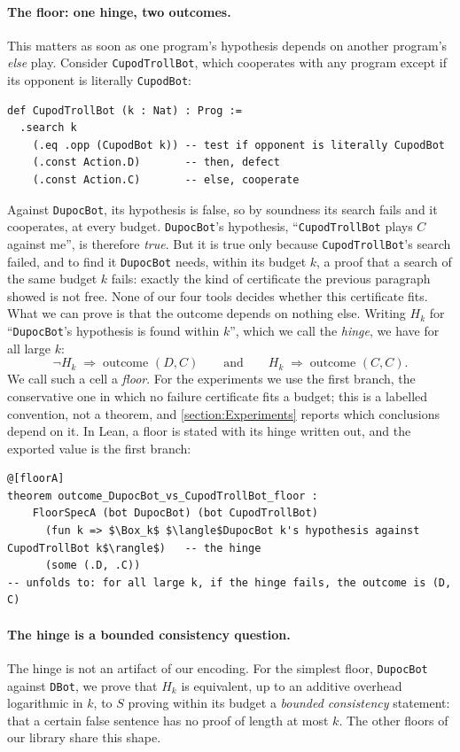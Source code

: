 \documentclass[twoside,11pt]{article}
\begin{document}
\paragraph{The floor: one hinge, two outcomes.}
This matters as soon as one program's hypothesis depends on another program's \emph{else} play. Consider \texttt{CupodTrollBot}, which cooperates with any program except if its opponent is literally \texttt{CupodBot}:
\begin{lstlisting}[style=pdlean]
def CupodTrollBot (k : Nat) : Prog :=
  .search k
    (.eq .opp (CupodBot k)) -- test if opponent is literally CupodBot
    (.const Action.D)       -- then, defect
    (.const Action.C)       -- else, cooperate
\end{lstlisting}
Against \texttt{DupocBot}, its hypothesis is false, so by soundness its search fails and it cooperates, at every budget. \texttt{DupocBot}'s hypothesis, \enquote{\texttt{CupodTrollBot} plays $C$ against me}, is therefore \emph{true}. But it is true only because \texttt{CupodTrollBot}'s search failed, and to find it \texttt{DupocBot} needs, within its budget $k$, a proof that a search of the same budget $k$ fails: exactly the kind of certificate the previous paragraph showed is not free. None of our four tools decides whether this certificate fits. What we can prove is that the outcome depends on nothing else. Writing $H_k$ for \enquote{\texttt{DupocBot}'s hypothesis is found within $k$}, which we call the \emph{hinge}, we have for all large $k$:
\[
  \neg H_k \;\Longrightarrow\; \text{outcome } (D, C)
  \qquad\text{and}\qquad
  H_k \;\Longrightarrow\; \text{outcome } (C, C).
\]
We call such a cell a \emph{floor}. For the experiments we use the first branch, the conservative one in which no failure certificate fits a budget; this is a labelled convention, not a theorem, and \cref{section:Experiments} reports which conclusions depend on it. In Lean, a floor is stated with its hinge written out, and the exported value is the first branch:
\begin{lstlisting}[style=pdlean, mathescape=true]
@[floorA]
theorem outcome_DupocBot_vs_CupodTrollBot_floor :
    FloorSpecA (bot DupocBot) (bot CupodTrollBot)
      (fun k => $\Box_k$ $\langle$DupocBot k's hypothesis against CupodTrollBot k$\rangle$)   -- the hinge
      (some (.D, .C))
-- unfolds to: for all large k, if the hinge fails, the outcome is (D, C)
\end{lstlisting}

\paragraph{The hinge is a bounded consistency question.}
The hinge is not an artifact of our encoding. For the simplest floor, \texttt{DupocBot} against \texttt{DBot}, we prove that $H_k$ is equivalent, up to an additive overhead logarithmic in $k$, to $S$ proving within its budget a \emph{bounded consistency} statement: that a certain false sentence has no proof of length at most $k$. The other floors of our library share this shape.
\end{document}

